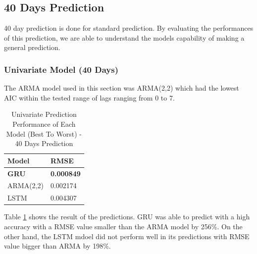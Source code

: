\subsection{40 Days Prediction}
40 day prediction is done for standard prediction. By evaluating the performances of this prediction, we are able to understand the models capability of making a general prediction.

\subsubsection{Univariate Model (40 Days)}
The ARMA model used in this section was ARMA(2,2) which had the lowest AIC \citep{AIC} within the tested range of lags ranging from 0 to 7. 

\begin{table}[h]
\caption{Univariate Prediction Performance of Each Model (Best To Worst) - 40 Days Prediction}
    \label{tab:40Uni}
    \centering
    \begin{tabular}{ |p{3cm}||p{3cm}| }
        \hline
         Model &  RMSE\\
        \hline
        \textbf{GRU}  & \textbf{0.000849}\\
        ARMA(2,2) & 0.002174\\
        LSTM  & 0.004307\\
    \hline
    \end{tabular}
\end{table}

Table \ref{tab:40Uni} shows the result of the predictions. GRU was able to predict with a high accuracy with a RMSE value smaller than the ARMA model by 256\%. On the other hand, the LSTM mdoel did not perform well in its predictions with RMSE value bigger than ARMA by 198\%. 

